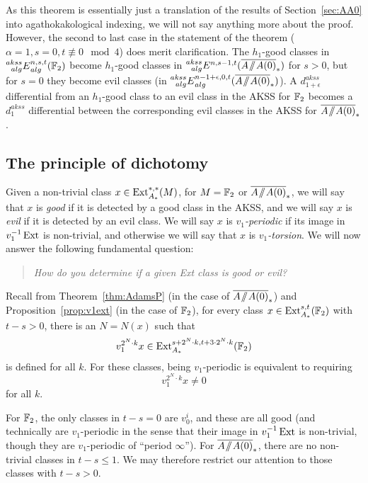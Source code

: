 As this theorem is essentially just a translation of the results of Section~\ref{sec:AA0} into agathokakological indexing, we will not say anything more about the proof.  However, the second to last case in the statement of the theorem ($\alpha = 1, s = 0, t \not\equiv 0 \mod 4$) does merit clarification.  The $h_1$-good classes in $\prescript{akss}{alg}{E}^{n,s,t}_{alg}(\mathbb{F}_2)$ become $h_1$-good classes in $\E{akss}{alg}^{n, s-1, t}(\AA0)$ for $s > 0$, but for $s = 0$ they become evil classes (in $\E{akss}{alg}^{n-1+\epsilon,0,t}_{alg}(\AA0)$).
A $d_{1+\epsilon}^{akss}$ differential from an $h_1$-good class to an evil class in the AKSS for $\mathbb{F}_2$ becomes a $d_1^{akss}$ differential between the corresponding evil classes in the AKSS for $\AA0$.

\subsection*{The principle of dichotomy}

Given a non-trivial class $x \in \operatorname{Ext}^{*,*}_{A_*}(M)$, for $M = \mathbb{F}_2$ or $\AA0$,  we will say that $x$ is \emph{good} if it is detected by a good class in the AKSS, and we will say $x$ is \emph{evil} if it is detected by an evil class.  We will say $x$ is \emph{$v_1$-periodic} if its image in $v_1^{-1}\operatorname{Ext}$ is non-trivial, and otherwise we will say that $x$ is \emph{$v_1$-torsion}.
We will now answer the following fundamental question:
\begin{quote}
{\it How do you determine if a given Ext class is good or evil?}
\end{quote}

Recall from Theorem~\ref{thm:AdamsP} (in the case of $\AA0$) and Proposition~\ref{prop:v1ext} (in the case of $\mathbb{F}_2$), for every class $x \in \operatorname{Ext}^{s,t}_{A_*}(\mathbb{F}_2)$ with $t-s > 0$, there is an $N = N(x)$ such that
\begin{equation}\label{eq:xxxxNxxx} v_1^{2^N \cdot k} x \in \operatorname{Ext}^{s+2^N\cdot k,t+3\cdot 2^N\cdot k}_{A_*}(\mathbb{F}_2) \end{equation}
is defined for all $k$. For these classes, being $v_1$-periodic is equivalent to requiring 
$$ v_1^{2^N\cdot k} x \ne 0 $$
for all $k$.  

For $\mathbb{F}_2$, the only classes in $t - s = 0$ are $v_0^i$, and these are all good (and technically are $v_1$-periodic in the sense that their image in $v_1^{-1}\operatorname{Ext}$ is non-trivial, though they are $v_1$-periodic of ``period $\infty$'').  For $\AA0$, there are no non-trivial classes in $t-s \le 1$.  We may therefore restrict our attention to those classes with $t-s > 0$.


